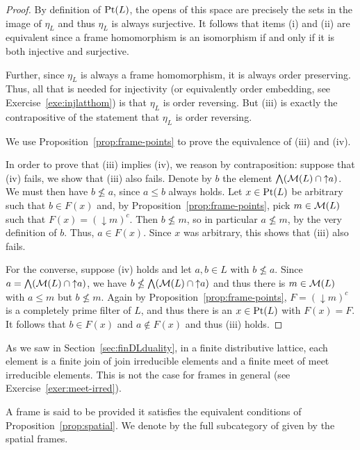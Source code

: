\begin{proof}
By definition of $\mathrm{Pt}(L)$, the opens of this space are precisely the sets in the image of $\eta_L$ and thus $\eta_L$ is always surjective. It follows that items (i) and (ii) are equivalent since a frame homomorphism is an isomorphism if and only if it is both injective and surjective.

Further, since $\eta_L$ is always a frame homomorphism, it is always order preserving. Thus, all that is needed for injectivity (or equivalently order embedding, see Exercise~\ref{exe:injlatthom}) is that $\eta_L$ is order reversing. But (iii) is exactly the contrapositive of the statement that $\eta_L$ is order reversing.

We use Proposition~\ref{prop:frame-points} to prove the equivalence of (iii) and (iv).

In order to prove that (iii) implies (iv), we reason by contraposition:  suppose that (iv) fails, we show that (iii) also fails. Denote by $b$ the element $\bigwedge (\mathcal{M}(L) \cap {\uparrow}a)$. We must then have $b \nleq a$, since $a \leq b$ always holds. Let $x \in \mathrm{Pt}(L)$ be arbitrary such that $b \in F(x)$ and, by Proposition~\ref{prop:frame-points}, pick $m \in \mathcal{M}(L)$ such that $F(x) = ({\downarrow}m)^c$. Then $b \nleq m$, so in particular $a \nleq m$, by the very definition of $b$. Thus, $a \in F(x)$. Since $x$ was arbitrary, this shows that (iii) also fails.

For the converse, suppose  (iv) holds and let $a,b\in L$ with $b\nleq a$. Since  $a=\bigwedge(\mathcal{M}(L)\cap{\uparrow} a)$, we have $b\nleq\bigwedge(\mathcal{M}(L)\cap{\uparrow} a)$ and thus there is $m\in\mathcal{M}(L)$ with $a\leq m$ but $b\nleq m$. Again by Proposition~\ref{prop:frame-points}, $F=({\downarrow}m)^c$ is a completely prime filter of $L$, and thus there is an $x\in\mathrm{Pt}(L)$ with $F(x)=F$. It follows that $b\in F(x)$ and $a\not\in F(x)$ and thus (iii) holds.
\end{proof}

\begin{remark}
As we saw in Section~\ref{sec:finDLduality}, in a finite distributive lattice, each element is a finite join of join irreducible elements and a finite meet of meet irreducible elements. This is not the case for frames in general (see Exercise~\ref{exer:meet-irred}).
\end{remark}

\begin{definition}\label{def:spatial}
A frame is said to be  provided it satisfies the equivalent conditions of Proposition~\ref{prop:spatial}. We denote by {\SpFrame} the full subcategory of {\Frame} given by the spatial frames.
\end{definition}

